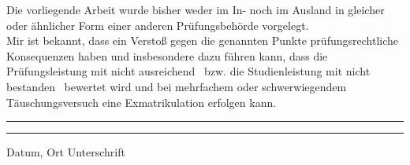 \documentclass[a4paper,oneside, 11pt, openany%
]{article}
\theoremstyle{custom}
\theoremstyle{custom}
\begin{document}
		Die vorliegende Arbeit wurde bisher weder im In- noch im Ausland in gleicher oder ähnlicher
		Form einer anderen Prüfungsbehörde vorgelegt.\\
		
		Mir ist bekannt, dass ein Verstoß gegen die genannten Punkte prüfungsrechtliche
		Konsequenzen haben und insbesondere dazu führen kann, dass die Prüfungsleistung mit
		\glqq nicht ausreichend\grqq~ bzw. die Studienleistung mit \glqq nicht bestanden\grqq~ bewertet wird und bei
		mehrfachem oder schwerwiegendem Täuschungsversuch eine Exmatrikulation erfolgen
		kann.
		\vspace{5cm}\\
		\noindent\rule{5cm}{.4pt}\hfill\rule{5cm}{.4pt}\par
		\noindent \hspace{12mm}Datum, Ort  \hspace{92mm}Unterschrift
\end{document}
